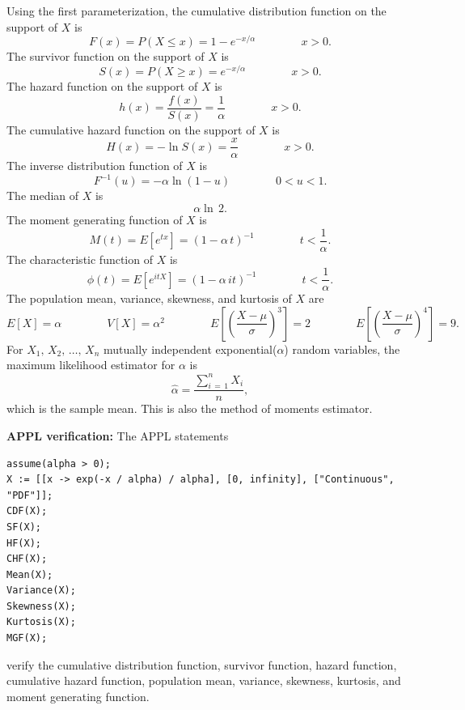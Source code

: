 \documentclass[12pt,fullpage]{article}
\begin{document}
\noindent
Using the first parameterization, the cumulative distribution function on
the support of $X$ is
$$
F(x) = P(X \le x) = 1 -  e ^ {- x / \alpha} \qquad \qquad x > 0.
$$
The survivor function on the support of $X$ is
$$
S(x) = P(X \ge x) = e ^ {-x / \alpha} \qquad \qquad x > 0.
$$
The hazard function on the support of $X$ is
$$
h(x) = \frac{f(x)}{S(x)} = \frac{1}{\alpha} \qquad \qquad x > 0.
$$
The cumulative hazard function on the support of $X$ is
$$
H(x) = - \ln S(x) = \frac{x}{\alpha} \qquad \qquad x > 0.
$$
The inverse distribution function of $X$ is
$$
F ^ {-1}(u) = - \alpha \ln (1 - u) \qquad \qquad 0 < u < 1.
$$
The median of $X$ is
$$
\alpha \ln \, 2 .
$$
The moment generating function of $X$ is
$$
M(t) = E\left[ e ^ {tx} \right] = (1 - \alpha\,t)^{-1} \qquad \qquad t < \frac{1}{\alpha}.
$$
The characteristic function of $X$ is
$$
\phi(t) = E\left[ e ^ {itX} \right] =  (1 - \alpha\,it)^{-1} \qquad \qquad t < \frac{1}{\alpha}.
$$
The population mean, variance, skewness, and kurtosis of $X$ are
$$
E[X] = \alpha \qquad \qquad 
V[X] = \alpha^2 \qquad \qquad 
E\left[ \left( \frac{X - \mu}{\sigma} \right) ^ 3 \right] = 2 \qquad \qquad 
E\left[ \left( \frac{X - \mu}{\sigma} \right) ^ 4 \right] = 9.
$$
For $X_1, \, X_2, \, \ldots , \, X_n$ mutually independent exponential($\alpha$) random variables,
the maximum likelihood estimator for $\alpha$ is
$$
\hat \alpha = \frac{\sum_{i\,=\,1}^n X_i}{n},
$$
which is the sample mean.  This is also the method of moments estimator. 
\vspace{0.1in}

\noindent
{\bf APPL verification:}
The APPL statements
\begin{verbatim}
assume(alpha > 0);
X := [[x -> exp(-x / alpha) / alpha], [0, infinity], ["Continuous", "PDF"]]; 
CDF(X);
SF(X);
HF(X);
CHF(X);
Mean(X);
Variance(X);
Skewness(X);
Kurtosis(X);
MGF(X);
\end{verbatim}
verify the cumulative distribution function, survivor function, hazard function, cumulative hazard function, population mean, variance, skewness, kurtosis, and moment generating function.
\end{document}

